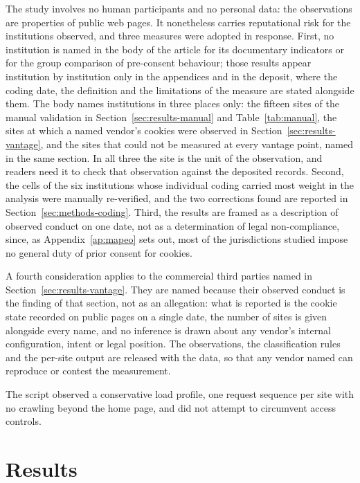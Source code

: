\documentclass[]{interact}
\begin{document}
The study involves no human participants and no personal data: the observations are properties of public web pages. It nonetheless carries reputational risk for the institutions observed, and three measures were adopted in response. First, no institution is named in the body of the article for its documentary indicators or for the group comparison of pre-consent behaviour; those results appear institution by institution only in the appendices and in the deposit, where the coding date, the definition and the limitations of the measure are stated alongside them. The body names institutions in three places only: the fifteen sites of the manual validation in Section~\ref{sec:results-manual} and Table~\ref{tab:manual}, the sites at which a named vendor's cookies were observed in Section~\ref{sec:results-vantage}, and the sites that could not be measured at every vantage point, named in the same section. In all three the site is the unit of the observation, and readers need it to check that observation against the deposited records. Second, the cells of the six institutions whose individual coding carried most weight in the analysis were manually re-verified, and the two corrections found are reported in Section~\ref{sec:methods-coding}. Third, the results are framed as a description of observed conduct on one date, not as a determination of legal non-compliance, since, as Appendix~\ref{ap:mapeo} sets out, most of the jurisdictions studied impose no general duty of prior consent for cookies.

A fourth consideration applies to the commercial third parties named in Section~\ref{sec:results-vantage}. They are named because their observed conduct is the finding of that section, not as an allegation: what is reported is the cookie state recorded on public pages on a single date, the number of sites is given alongside every name, and no inference is drawn about any vendor's internal configuration, intent or legal position. The observations, the classification rules and the per-site output are released with the data, so that any vendor named can reproduce or contest the measurement.

The script observed a conservative load profile, one request sequence per site with no crawling beyond the home page, and did not attempt to circumvent access controls.

\section{Results}\label{sec:results}
\end{document}
